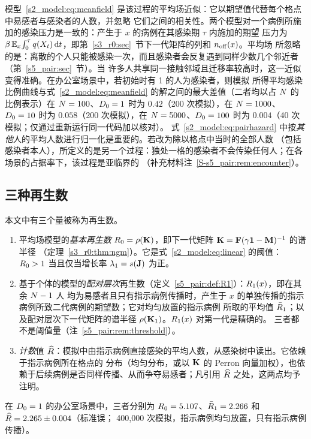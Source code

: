 模型~\eqref{s2_model:eq:meanfield} 是该过程的平均场近似：它以期望值代替每个格点中易感者与感染者的人数，并忽略
它们之间的相关性。两个模型对一个病例所施加的感染压力是一致的：产生于 $x$ 的病例在其感染期 $\tau$ 内施加的期望
压力为 $\beta\,\mathbb{E}_x\!\int_0^\tau q(X_t)\,\mathrm{d} t$，即第~\ref{s3_r0:sec}~节下一代矩阵的列和 $n_{\mathrm{off}}(x)$。平均场
所忽略的是：离散的个人只能被感染一次，而且感染者会反复遇到同样少数几个邻近者（第~\ref{s5_pair:sec}~节）。当
许多人共享同一接触邻域且迁移率较高时，这一近似变得准确。在办公室场景中，若初始时有 1\pct{} 的人为感染者，则模拟
所得平均感染比例曲线与式~\eqref{s2_model:eq:meanfield} 的解之间的最大差值（二者均以占 $N$ 的比例表示）在
$N=100$、$D_0=1$ 时为 $0.42$（200 次模拟），在 $N=1000$、$D_0=10$ 时为 $0.058$（200 次模拟），在
$N=5000$、$D_0=100$ 时为 $0.004$（40 次模拟；仅通过重新运行同一代码加以核对）。
式~\eqref{s2_model:eq:pairhazard} 中按\emph{其他}人的平均人数进行归一化是重要的。若改为除以格点中当时的全部人数
（包括感染者本人），所定义的是另一个过程：独处一格的感染者不会传染任何人；在各场景的占据率下，该过程是亚临界的
（补充材料注~\ref{S-s5_pair:rem:encounter}）。

\subsection{三种再生数}\label{s2_model:sec:numbers}

本文中有三个量被称为再生数。
\begin{enumerate}
  \item 平均场模型的\emph{基本再生数} $R_0=\rho(\mathbf{K})$，即下一代矩阵 $\mathbf{K}=\mathbf{F}(\gamma\mathbf{1}-\mathbf{M})^{-1}$ 的谱半径
    （定理~\ref{s3_r0:thm:ngm}）。它是式~\eqref{s2_model:eq:linear} 的阈值：$R_0>1$ 当且仅当增长率
    $\lambda_1=s(\mathbf{J})$ 为正。
  \item 基于个体的模型的\emph{配对层次}再生数（定义~\ref{s5_pair:def:R1}）：$R_1(x)$，即在其余 $N-1$ 人
    均为易感者且只有指示病例传播时，产生于 $x$ 的单独传播的指示病例所致二代病例的期望数；它对均匀放置的指示病例
    所取的平均值 $\bar{R}_1$；以及配对层次下一代矩阵的谱半径 $\rho(\mathbf{K}_1)$。$R_1(x)$ 对第一代是精确的。
    三者都不是阈值量（注~\ref{s5_pair:rem:threshold}）。
  \item \emph{计数}值 $\widehat{R}$：模拟中由指示病例直接感染的平均人数，从感染树中读出。它依赖于指示病例所在格点的
    分布（均匀分布，或以 $\mathbf{K}$ 的 Perron 向量加权），也依赖于后续病例是否同样传播、从而争夺易感者；凡引用
    $\widehat{R}$ 之处，这两点均予注明。
\end{enumerate}
在 $D_0=1$ 的办公室场景中，三者分别为 $R_0=5.107$、$\bar{R}_1=2.266$ 和 $\widehat{R}=2.265\pm0.004$（标准误；
400{,}000 次模拟，指示病例均匀放置，只有指示病例传播）。

